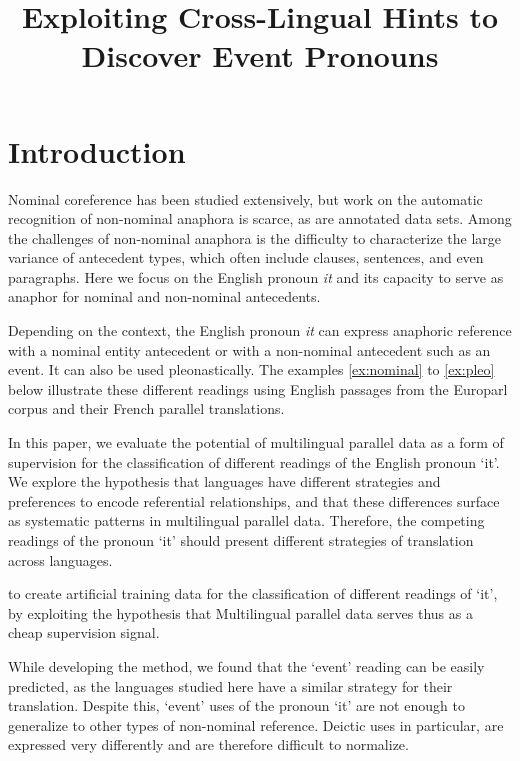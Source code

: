 \documentclass[10pt, a4paper]{article} \usepackage{lrec} \usepackage{multibib}
\title{Exploiting Cross-Lingual Hints to Discover Event Pronouns}
\begin{document}
\maketitleabstract

\section{Introduction}

\renewcommand{\thefootnote}{\fnsymbol{footnote}}


Nominal coreference has been studied extensively, but work on the automatic 
recognition of non-nominal anaphora is scarce, as are annotated data sets. Among 
the challenges of non-nominal anaphora is the difficulty to characterize the 
large variance of antecedent types, which often include clauses, sentences, and 
even paragraphs. Here we focus on the English pronoun \textit{it} and its 
capacity to serve as anaphor for nominal and non-nominal antecedents. 

Depending on the context, the English pronoun \textit{it} can express anaphoric 
reference with a nominal entity antecedent or with a
non-nominal antecedent such as an event. It can also be used
pleonastically. The examples \ref{ex:nominal} to \ref{ex:pleo} below illustrate
these different readings using English passages from the Europarl corpus and
their French parallel translations. 

In this paper, we evaluate the potential of multilingual parallel data as a 
form of supervision for the classification of different readings of the English 
pronoun `it'. We explore the hypothesis that languages have different strategies 
and preferences to encode referential relationships, and that these differences 
surface as systematic patterns in multilingual parallel data. Therefore, the 
competing readings of the pronoun `it' should present different strategies of 
translation across languages.  


to create 
artificial training data for the classification of different readings of `it', 
by exploiting the hypothesis that  Multilingual parallel data serves thus as a cheap
supervision signal. 

While developing the method, we found that the `event' reading can be easily
predicted, as the languages studied here have a similar strategy for their translation. 
Despite this, `event' uses of the pronoun `it' are not enough to generalize to
other types of non-nominal reference. Deictic uses in particular, are expressed
very differently and are therefore difficult to normalize.
\end{document}
